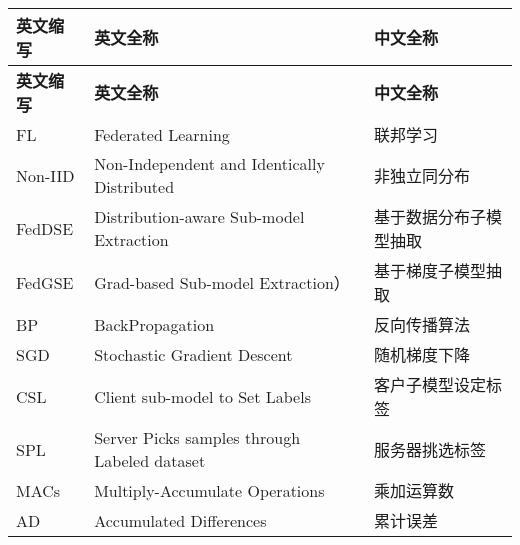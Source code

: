 \cleardoublepage
{}
\begin{center}
    \begin{longtable}{m{2cm}m{8cm}m{5cm}}
        \toprule
        \textbf{英文缩写}&\textbf{英文全称}&\textbf{中文全称}\\
        \midrule
        \endfirsthead
        \toprule
        \textbf{英文缩写}&\textbf{英文全称}&\textbf{中文全称}\\
        \midrule
        \endhead 
        \bottomrule
        \endfoot
        \bottomrule
        \endlastfoot
        FL&Federated Learning&联邦学习\\
        Non-IID&Non-Independent and Identically
        Distributed&非独立同分布\\
        FedDSE&Distribution-aware Sub-model Extraction&基于数据分布子模型抽取\\
        FedGSE&Grad-based Sub-model Extraction）&基于梯度子模型抽取\\
        BP&BackPropagation&反向传播算法\\
        SGD&Stochastic Gradient Descent&随机梯度下降\\
        CSL&Client sub-model to Set Labels&客户子模型设定标签\\
        SPL&Server Picks samples through Labeled dataset&服务器挑选标签\\ 
        MACs & Multiply-Accumulate Operations & 乘加运算数 \\
        AD & Accumulated Differences & 累计误差 \\
        


	\end{longtable}
\end{center}